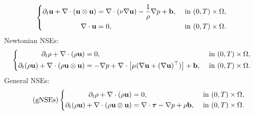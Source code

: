 \documentclass[oneside,11pt]{book}
\numberwithin{equation}{section}
\begin{document}
\begin{equation}
    \label{instationary incompressible NSEs}
    \left\{\begin{split}
        \partial_t{\bf u} + \nabla\cdot({\bf u}\otimes{\bf u}) &= \nabla\cdot(\nu\nabla{\bf u}) - \frac{1}{\rho}\nabla p + {\bf b}, &&\mbox{ in } (0,T)\times\Omega,\\
        \nabla\cdot{\bf u} &= 0, &&\mbox{ in } (0,T)\times\Omega.
    \end{split}\right.
\end{equation}
Newtonian NSEs:
\begin{equation}
    \label{Newtonian NSEs}
    \left\{\begin{split}
        \partial_t\rho + \nabla\cdot(\rho{\bf u}) &= 0, &&\mbox{ in } (0,T)\times\Omega,\\
        \partial_t(\rho{\bf u}) + \nabla\cdot(\rho{\bf u}\otimes{\bf u}) &= -\nabla p + \nabla\cdot\left[\mu(\nabla{\bf u} + (\nabla{\bf u})^\top)\right] + {\bf b}, &&\mbox{ in } (0,T)\times\Omega.
    \end{split}\right.
\end{equation}
General NSEs:
\begin{equation}
    \label{general NSEs}
    \tag{gNSEs}
    \left\{\begin{split}
        \partial_t\rho + \nabla\cdot(\rho{\bf u}) &= 0, &&\mbox{ in } (0,T)\times\Omega,\\
        \partial_t(\rho{\bf u}) + \nabla\cdot(\rho{\bf u}\otimes{\bf u}) &= \nabla\cdot\boldsymbol{\tau} - \nabla p + \rho{\bf b}, &&\mbox{ in } (0,T)\times\Omega.
    \end{split}\right.
\end{equation}
\end{document}
